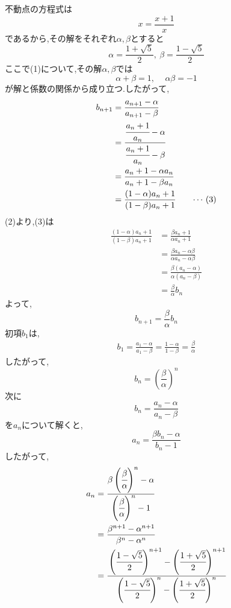 \begin{enumerate}[label=(\arabic*),parsep=3pt]
            不動点の方程式は
            \[
              x=\frac{x+1}{x}\tag*{\(\cdots\) (1)}
            \]
            であるから,その解をそれぞれ$\alpha,\beta$とすると
            \[
              \alpha=\frac{1+\sqrt{5}}{2},\ \beta=\frac{1-\sqrt{5}}{2}
            \]
            ここで(1)について,その解$\alpha,\beta$では
            \[
              \alpha+\beta=1,\, \quad \alpha\beta=-1\tag*{\(\cdots\) (2)}
            \]
            が解と係数の関係から成り立つ.したがって,
            \begin{align*}
              b_{n+1}&=\frac{a_{n+1}-\alpha}{a_{n+1}-\beta}\\
              &=\cfrac{\cfrac{a_n+1}{a_n}-\alpha}{\cfrac{a_n+1}{a_n}-\beta}\\
              &=\frac{a_n+1-\alpha a_n}{a_n+1-\beta a_n}\\
              &=\frac{(1-\alpha)a_n+1}{(1-\beta)a_n+1}\tag*{\(\cdots\) (3)}
            \end{align*}
            (2)より,(3)は
            \begin{align*}
              \frac{(1-\alpha)a_n+1}{(1-\beta)a_n+1}&=\frac{\beta a_n+1}{\alpha a_n+1}\\
              &=\frac{\beta a_n-\alpha\beta}{\alpha a_n-\alpha\beta}\\
              &=\frac{\beta (a_n-\alpha)}{\alpha (a_n-\beta)}\\
              &=\frac{\beta}{\alpha}b_n
            \end{align*}
            よって,
            \[
              b_{n+1}=\frac{\beta}{\alpha}b_n
            \]
            初項$b_1$は,
            \begin{align*}
              b_1=\frac{a_1-\alpha}{a_1-\beta}=\frac{1-\alpha}{1-\beta}=\frac{\beta}{\alpha}
            \end{align*}
            したがって,
            \[
              b_n=\left(\frac{\beta}{\alpha}\right)^n
            \]
            次に
            \[
              b_{n}=\frac{a_{n}-\alpha}{a_{n}-\beta}
            \]
            を$a_n$について解くと,
            \[
              a_{n}=\frac{\beta b_{n}-\alpha}{b_{n}-1}
            \]
            したがって,
            \begin{align*}
              a_{n}&=\cfrac{\beta \left(\cfrac{\beta}{\alpha}\right)^n-\alpha}{\left(\cfrac{\beta}{\alpha}\right)^n-1}  \\
              &=\frac{\beta^{n+1}-\alpha^{n+1}}{\beta^n-\alpha^n}\\
              &=\cfrac{\left(\cfrac{1-\sqrt{5}}{2}\right)^{n+1}-\left(\cfrac{1+\sqrt{5}}{2}\right)^{n+1}}{\left(\cfrac{1-\sqrt{5}}{2}\right)^n-\left(\cfrac{1+\sqrt{5}}{2}\right)^n}
            \end{align*}        
    \end{enumerate}
